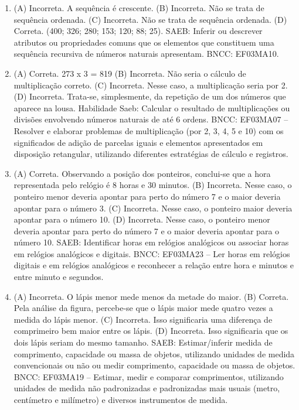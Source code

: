 \begin{enumerate}
\item
(A) Incorreta. A sequência é crescente.
(B) Incorreta. Não se trata de sequência ordenada.
(C) Incorreta. Não se trata de sequência ordenada.
(D) Correta. (400; 326; 280; 153; 120; 88; 25).
SAEB: Inferir ou descrever atributos ou propriedades comuns
que os elementos que constituem uma sequência recursiva de números
naturais apresentam.
BNCC: EF03MA10.

\item
(A) Correta. 273 x 3 = 819
(B) Incorreta. Não seria o cálculo de multiplicação correto.
(C) Incorreta. Nesse caso, a multiplicação seria por 2.
(D) Incorreta. Trata-se, simplesmente, da repetição de um dos números que aparece na lousa.
Habilidade Saeb: Calcular o resultado de multiplicações ou divisões
envolvendo números naturais de até 6 ordens.
BNCC: EF03MA07 – Resolver e elaborar problemas de multiplicação (por 2, 3, 4, 5 e 10) com os
significados de adição de parcelas iguais e elementos apresentados em disposição retangular,
utilizando diferentes estratégias de cálculo e registros.

\item
(A) Correta. Observando a posição dos ponteiros, conclui-se que a hora representada pelo
relógio é 8 horas e 30 minutos.
(B) Incorreta. Nesse caso, o ponteiro menor deveria apontar para perto do número 7 e o maior deveria apontar para o número 3.
(C) Incorreta. Nesse caso, o ponteiro maior deveria apontar para o número 10.
(D) Incorreta. Nesse caso, o ponteiro menor deveria apontar para perto do número 7 e o maior deveria apontar para o número 10.
SAEB: Identificar horas em relógios analógicos ou associar
horas em relógios analógicos e digitais.
BNCC: EF03MA23 – Ler horas em relógios digitais e em relógios analógicos e reconhecer a relação
entre hora e minutos e entre minuto e segundos.

\item
(A) Incorreta. O lápis menor mede menos da metade do maior.
(B) Correta. Pela análise da figura, percebe-se que o lápis maior mede quatro vezes a medida do lápis menor.
(C) Incorreta. Isso significaria uma diferença de comprimeiro bem maior entre os lápis.
(D) Incorreta. Isso significaria que os dois lápis seriam do mesmo tamanho.
SAEB: Estimar/inferir medida de comprimento, capacidade ou
massa de objetos, utilizando unidades de medida convencionais ou não ou
medir comprimento, capacidade ou massa de objetos.
BNCC: EF03MA19 -- Estimar, medir e comparar comprimentos, utilizando unidades de medida
não padronizadas e padronizadas mais usuais (metro, centímetro e milímetro) e diversos
instrumentos de medida.
\end{enumerate}

